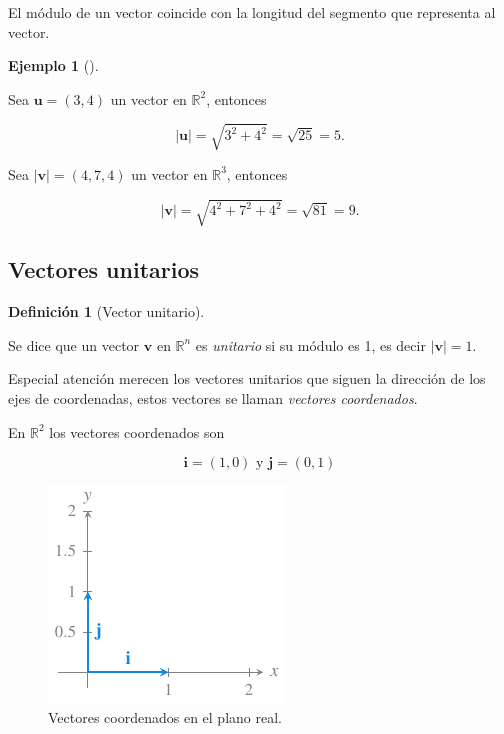 \documentclass[
  a4paper,
]{scrreport}
\theoremstyle{definition}
\newtheorem{example}{Ejemplo}[chapter]
\theoremstyle{plain}
\theoremstyle{plain}
\theoremstyle{plain}
\theoremstyle{definition}
\newtheorem{definition}{Definición}[chapter]
\theoremstyle{remark}
\begin{document}
El módulo de un vector coincide con la longitud del segmento que
representa al vector.

\begin{example}[]\protect\hypertarget{exm-modulo-vector}{}\label{exm-modulo-vector}

Sea \(\mathbf{u}=(3,4)\) un vector en \(\mathbb{R}^2\), entonces

\[
\lvert \mathbf{u} \rvert = \sqrt{3^2+4^2} = \sqrt{25} = 5.
\]

Sea \(\lvert \mathbf{v}\rvert =(4,7,4)\) un vector en \(\mathbb{R}^3\),
entonces

\[
\lvert \mathbf{v} \vert = \sqrt{4^2+7^2+4^2} = \sqrt{81} = 9.
\]

\end{example}

\hypertarget{vectores-unitarios}{%
\subsection{Vectores unitarios}\label{vectores-unitarios}}

\begin{definition}[Vector
unitario]\protect\hypertarget{def-vector-unitario}{}\label{def-vector-unitario}

Se dice que un vector \(\mathbf{v}\) en \(\mathbb{R}^n\) es
\emph{unitario} si su módulo es 1, es decir
\(\lvert \mathbf{v}\rvert=1\).

\end{definition}

Especial atención merecen los vectores unitarios que siguen la dirección
de los ejes de coordenadas, estos vectores se llaman \emph{vectores
coordenados}.

En \(\mathbb{R}^2\) los vectores coordenados son

\[\mathbf{i}=(1,0)\mbox{ y }\mathbf{j}=(0,1)\]

\begin{figure}

{\centering \includegraphics{img/geometria-plano-espacio/vectores-coordenados-plano.pdf}

}

\caption{Vectores coordenados en el plano real.}

\end{figure}
\end{document}
